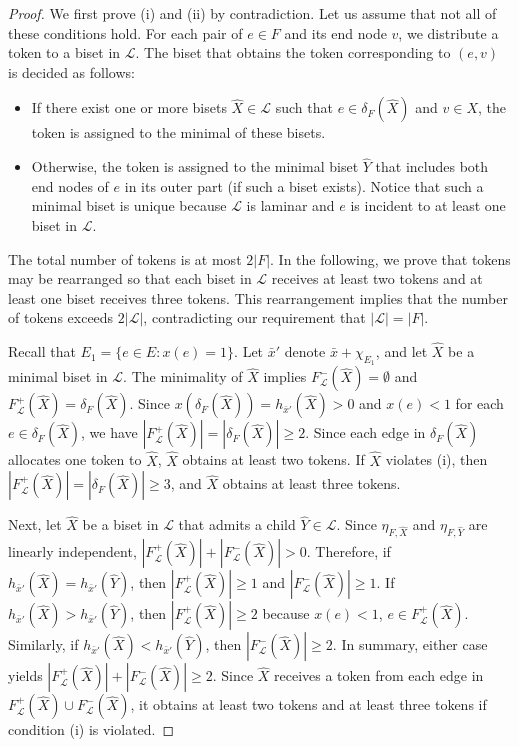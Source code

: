 \documentclass{article}
\newcommand{\Lfam}{\mathcal{L}}
\begin{document}
\begin{proof}
We first prove (i) and (ii) by contradiction. Let us assume that not all of these
conditions hold. For each pair of $e \in F$ and its end node $v$, we distribute a token
to a biset in $\Lfam$. The biset that obtains the token corresponding to $(e,v)$ is decided
as follows:
\begin{itemize}
 \item If there exist one or more bisets $\hat{X}\in \Lfam$ such that 
	$e \in \delta_F(\hat{X})$ and $v \in X$, the token is assigned to the minimal of these bisets.
\item Otherwise, the token is assigned to the minimal biset $\hat{Y}$ that 
includes both end nodes of $e$ in its outer part (if such a biset exists).
	Notice that such a minimal biset is unique because $\Lfam$ is laminar and $e$ is incident to at
	least one biset in $\Lfam$.
\end{itemize}

The total number of tokens is at most $2|F|$. In the following, 
we prove that tokens may be rearranged so that each
biset in $\Lfam$ receives at least two tokens and at least one biset receives three tokens. 
This rearrangement implies that the number of tokens exceeds
$2|\Lfam|$, contradicting our requirement that $|\Lfam|=|F|$.

Recall that $E_1=\{e \in E \colon x(e)=1\}$.
Let $\bar{x}'$ denote $\bar{x}+\chi_{E_1}$, and
let $\hat{X}$ be a minimal biset in $\Lfam$. 
The minimality of $\hat{X}$ implies $F^-_{\Lfam}(\hat{X})= \emptyset$
and $F^+_{\Lfam}(\hat{X})= \delta_F(\hat{X})$.
Since $x(\delta_F(\hat{X}))=h_{\bar{x}'}(\hat{X}) >0$ and $x(e) < 1$ for each 
$e \in \delta_F(\hat{X})$, we have 
$|F^+_{\Lfam}(\hat{X})|=|\delta_F(\hat{X})| \geq 2$. 
Since each edge in $\delta_F(\hat{X})$ allocates one token to $\hat{X}$, $\hat{X}$
obtains at least two tokens. If $\hat{X}$ violates (i), 
then $|F^+_{\Lfam}(\hat{X})|=|\delta_F(\hat{X})| \geq 3$, and
$\hat{X}$ obtains at least three tokens.

Next, let $\hat{X}$ be a biset in $\Lfam$ that admits a child $\hat{Y} \in \Lfam$.
Since $\eta_{F,\hat{X}}$ and $\eta_{F,\hat{Y}}$ are linearly independent,
$|F_{\Lfam}^+(\hat{X})| + |F^-_{\Lfam}(\hat{X})|> 0$.
Therefore,
if $h_{\bar{x}'}(\hat{X})=h_{\bar{x}'}(\hat{Y})$, then
$|F_{\Lfam}^+(\hat{X})|\geq 1$ and $|F^-_{\Lfam}(\hat{X})| \geq 1$.
If $h_{\bar{x}'}(\hat{X}) > h_{\bar{x}'}(\hat{Y})$, then 
$|F_{\Lfam}^+(\hat{X})| \geq 2$ because $x(e)<1$, 
$e \in F_{\Lfam}^+(\hat{X})$. Similarly,
if $h_{\bar{x}'}(\hat{X}) < h_{\bar{x}'}(\hat{Y})$, then 
$|F_{\Lfam}^- (\hat{X})| \geq 2$.
In summary, either case yields
$|F_{\Lfam}^+(\hat{X})| + |F^-_{\Lfam}(\hat{X})|\geq 2$.
Since $\hat{X}$ receives a token from
each edge in $F_{\Lfam}^+(\hat{X}) \cup F^-_{\Lfam}(\hat{X})$, it obtains
at least two tokens and 
at least three tokens if condition (i) is violated.


\end{proof}
\end{document}
